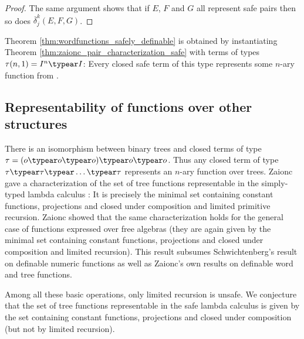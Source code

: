 \begin{proof}
  The same argument shows that if $E$, $F$ and $G$ all represent safe pairs
then so does $\overline \delta^k_j (E,F,G)$.
\end{proof}


Theorem \ref{thm:wordfunctions_safely_definable} is obtained by
instantiating Theorem \ref{thm:zaionc_pair_characterization_safe}
with terms of types $\tau(n,1) = I^n\typear I$: Every
closed safe term of this type represents some $n$-ary function from
\safedefset.

\subsection{Representability of functions over other structures}\hfill

There is an isomorphism between binary trees and closed terms of
type $\tau =(o\typear o\typear o) \typear o \typear o$. Thus any
closed term of type $\tau\typear\tau \typear \ldots \typear \tau $
represents an $n$-ary function over trees. Zaionc gave a
characterization of the set of tree functions representable in the
simply-typed lambda calculus \cite{DBLP:conf/aluacs/Zaionc88}: It is
precisely the minimal set containing constant functions, projections
and closed under composition and limited primitive recursion. Zaionc
showed that the same characterization holds for the general case of
functions expressed over free algebras
\cite{DBLP:journals/apal/Zaionc91} (they are again given by the
minimal set containing constant functions, projections and closed
under composition and limited recursion). This result subsumes
Schwichtenberg's result on definable numeric functions as well as
Zaionc's own results on definable word and tree functions.

Among all these basic operations, only limited recursion is unsafe.
We conjecture that the set of tree functions representable in the
safe lambda calculus is given by the set containing constant
functions, projections and closed under composition (but not by
limited recursion).
